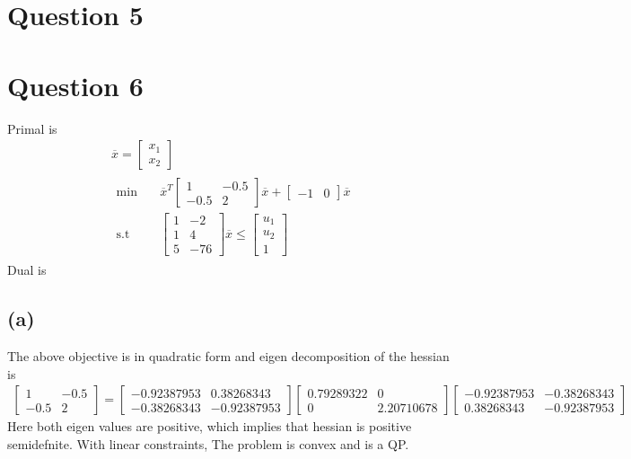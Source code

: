 \documentclass{article}
\begin{document}
\section*{\hfil Question 5}
\section*{\hfil Question 6}
Primal is
\begin{gather*}
	\overline{x} = \begin{bmatrix}
	x_1 \\
	x_2 
	\end{bmatrix}\\
	\begin{aligned}
		\min \quad & \overline{x}^T\begin{bmatrix}
		1 & -0.5\\
		-0.5 & 2
		\end{bmatrix}\overline{x} + \begin{bmatrix}
		-1 & 0
		\end{bmatrix}\overline{x}\\
		\textrm{s.t} \quad & \begin{bmatrix}
		1 & -2\\
		1 & 4\\
		5 & -76
		\end{bmatrix}\overline{x} \le \begin{bmatrix}
		u_1\\
		u_2\\
		1
		\end{bmatrix}
	\end{aligned}
\end{gather*}
Dual is 
\subsection*{(a)}
The above objective is in quadratic form and eigen decomposition of the hessian is
\begin{gather*}
	\begin{bmatrix}
		1 & -0.5\\
		-0.5 & 2
	\end{bmatrix} = \begin{bmatrix}
		-0.92387953 & 0.38268343\\
		-0.38268343 & -0.92387953
		\end{bmatrix}\begin{bmatrix}
		0.79289322 & 0\\
		0 & 2.20710678
		\end{bmatrix}\begin{bmatrix}
		-0.92387953 & -0.38268343\\
		0.38268343 & -0.92387953
		\end{bmatrix}
\end{gather*}
Here both eigen values are positive, which implies that hessian is positive semidefnite. With linear constraints, The problem is convex and is a QP.
\end{document}
